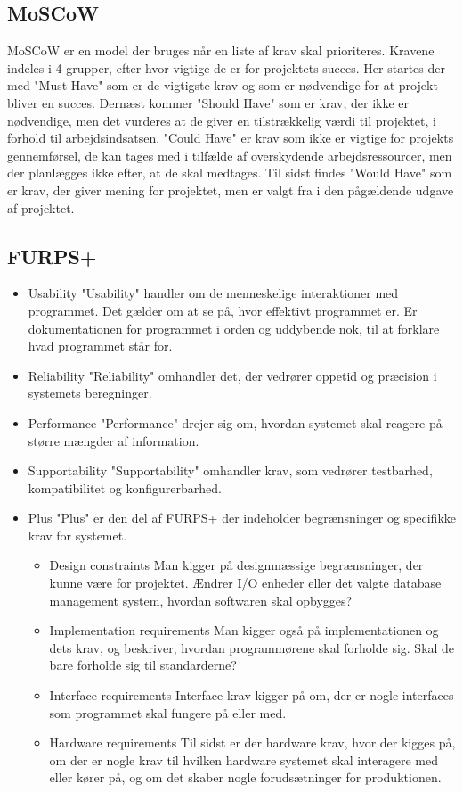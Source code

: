 \subsection{MoSCoW}
MoSCoW er en model der bruges når en liste af krav skal prioriteres. Kravene indeles i 4 grupper, efter hvor vigtige de er for projektets succes. Her startes der med "Must Have" som er de vigtigste krav og som er nødvendige for at projekt bliver en succes. Dernæst kommer "Should Have" som er krav, der ikke er nødvendige, men det vurderes at de giver en tilstrækkelig værdi til projektet, i forhold til arbejdsindsatsen. "Could Have" er krav som ikke er vigtige for projekts gennemførsel, de kan tages med i tilfælde af overskydende arbejdsressourcer, men der planlægges ikke efter, at de skal medtages. Til sidst findes "Would Have" som er krav, der giver mening for projektet, men er valgt fra i den pågældende udgave af projektet. 

\subsection{FURPS+}

\begin{itemize}
    \setlength\itemsep{0em}
    \item Usability
    \subitem "Usability" handler om de menneskelige interaktioner med programmet. Det gælder om at se på, hvor effektivt programmet er. Er dokumentationen for programmet i orden og uddybende nok, til at forklare hvad programmet står for.
    \item Reliability
    \subitem "Reliability" omhandler det, der vedrører oppetid og præcision i systemets beregninger.
    \item Performance
    \subitem "Performance" drejer sig om, hvordan systemet skal reagere på større mængder af information.
    \item Supportability
    \subitem "Supportability" omhandler krav, som vedrører testbarhed, kompatibilitet og konfigurerbarhed.
    \item Plus
    \subitem "Plus" er den del af FURPS+ der indeholder begrænsninger og specifikke krav for systemet.
    \begin{itemize}
        \item Design constraints
        \subitem Man kigger på designmæssige begrænsninger, der kunne være for projektet. Ændrer I/O enheder eller det valgte database management system, hvordan softwaren skal opbygges?
        \item Implementation requirements
        \subitem Man kigger også på implementationen og dets krav, og beskriver, hvordan programmørene skal forholde sig. Skal de bare forholde sig til standarderne?
        \item Interface requirements
        \subitem Interface krav kigger på om, der er nogle interfaces som programmet skal fungere på eller med.
        \item Hardware requirements
        \subitem Til sidst er der hardware krav, hvor der kigges på, om der er nogle krav til hvilken hardware systemet skal interagere med eller kører på, og om det skaber nogle forudsætninger for produktionen. 
    \end{itemize}
\end{itemize}

